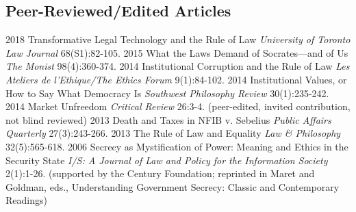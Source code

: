 \documentclass[letterpaper]{moderncv}
\begin{document}
\subsection{Peer-Reviewed/Edited Articles}
\cventry
{2018}
{Transformative Legal Technology and the Rule of Law}
{}
{\textit{University of Toronto Law Journal}}
{}
{68(S1):82-105. }
\vspace{1mm}
\cventry
{2015}
{What the Laws Demand of Socrates---and of Us}
{}
{\textit{The Monist}}
{}
{98(4):360-374. }
\vspace{1mm}
\cventry
{2014}
{Institutional Corruption and the Rule of Law}
{}
{\textit{Les Ateliers de l'Ethique/The Ethics Forum}}
{}
{9(1):84-102. }
\vspace{1mm}
\cventry
{2014}
{Institutional Values, or How to Say What Democracy Is}
{}
{\textit{Southwest Philosophy Review}}
{}
{30(1):235-242. }
\vspace{1mm}
\cventry
{2014}
{Market Unfreedom}
{}
{\textit{Critical Review}}
{}
{26:3-4. (peer-edited, invited contribution, not blind reviewed)}
\vspace{1mm}
\cventry
{2013}
{Death and Taxes in NFIB v. Sebelius}
{}
{\textit{Public Affairs Quarterly}}
{}
{27(3):243-266. }
\vspace{1mm}
\cventry
{2013}
{The Rule of Law and Equality}
{}
{\textit{Law \& Philosophy}}
{}
{32(5):565-618. }
\vspace{1mm}
\cventry
{2006}
{Secrecy as Mystification of Power: Meaning and Ethics in the Security State}
{}
{\textit{I/S: A Journal of Law and Policy for the Information Society}}
{}
{2(1):1-26. (supported by the Century Foundation; reprinted in Maret and Goldman, eds., Understanding Government Secrecy: Classic and Contemporary Readings)}
\vspace{1mm}
\vspace{1mm}
\end{document}
